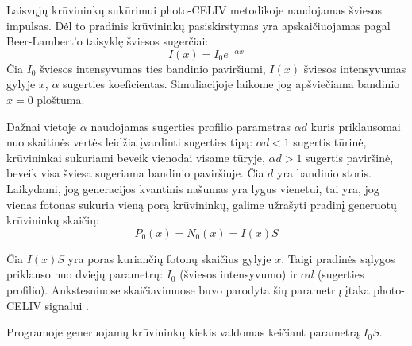 Laisvųjų krūvininkų sukūrimui photo-CELIV metodikoje naudojamas šviesos impulsas. Dėl to pradinis krūvininkų pasiskirstymas yra apskaičiuojamas pagal Beer-Lambert’o taisyklę šviesos sugerčiai:
\begin{equation}
	I(x)=I_0 e^{-\alpha x}
\end{equation}
Čia \(I_0\) šviesos intensyvumas ties bandinio paviršiumi, \(I(x)\) šviesos intensyvumas gylyje \(x\), \(\alpha\) sugerties koeficientas.
Simuliacijoje laikome jog apšviečiama bandinio \(x=0\) ploštuma.

Dažnai vietoje \(\alpha\) naudojamas sugerties profilio parametras \(\alpha d\) kuris priklausomai nuo skaitinės vertės leidžia įvardinti sugerties tipą: \(\alpha d < 1\) sugertis tūrinė, krūvininkai sukuriami beveik vienodai visame tūryje, \(\alpha d > 1\) sugertis paviršinė, beveik visa šviesa sugeriama bandinio paviršiuje. Čia \(d\) yra bandinio storis.
Laikydami, jog generacijos kvantinis našumas yra lygus vienetui, tai yra, jog vienas fotonas sukuria vieną porą krūvininkų, galime užrašyti pradinį generuotų krūvininkų skaičių:
\begin{equation}
	P_0(x) = N_0(x) = I(x)S
\end{equation}
	
Čia \(I(x)S\) yra poras kuriančių fotonų skaičius gylyje \(x\).
Taigi pradinės sąlygos priklauso nuo dviejų parametrų: \(I_0\) (šviesos intensyvumo) ir \(\alpha d\) (sugerties profilio). Ankstesniuose skaičiavimuose buvo parodyta šių parametrų įtaka photo-CELIV signalui \cite{juška:155202}.

Programoje generuojamų krūvininkų kiekis valdomas keičiant parametrą \(I_0 S\).